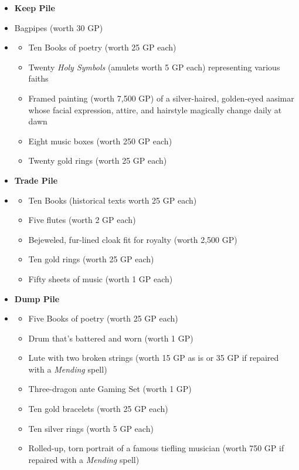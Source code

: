 \documentclass[letterpaper, 11pt, twocolumn]{dndbook}
\begin{document}
\begin{itemize}
\item \textbf{Keep Pile}
\item Bagpipes (worth 30 GP)
\item \begin{itemize}
\item Ten Books of poetry (worth 25 GP each)
\item Twenty \textit{Holy Symbols} (amulets worth 5 GP each) representing various faiths
\item Framed painting (worth 7,500 GP) of a silver-haired, golden-eyed aasimar whose facial expression, attire, and hairstyle magically change daily at dawn
\item Eight music boxes (worth 250 GP each)
\item Twenty gold rings (worth 25 GP each)
\end{itemize}
\item \textbf{Trade Pile}
\item \begin{itemize}
\item Ten Books (historical texts worth 25 GP each)
\item Five flutes (worth 2 GP each)
\item Bejeweled, fur-lined cloak fit for royalty (worth 2,500 GP)
\item Ten gold rings (worth 25 GP each)
\item Fifty sheets of music (worth 1 GP each)
\end{itemize}
\item \textbf{Dump Pile}
\item \begin{itemize}
\item Five Books of poetry (worth 25 GP each)
\item Drum that's battered and worn (worth 1 GP)
\item Lute with two broken strings (worth 15 GP as is or 35 GP if repaired with a \textit{Mending} spell)
\item Three-dragon ante Gaming Set (worth 1 GP)
\item Ten gold bracelets (worth 25 GP each)
\item Ten silver rings (worth 5 GP each)
\item Rolled-up, torn portrait of a famous tiefling musician (worth 750 GP if repaired with a \textit{Mending} spell)
\end{itemize}
\end{itemize}
\end{document}
